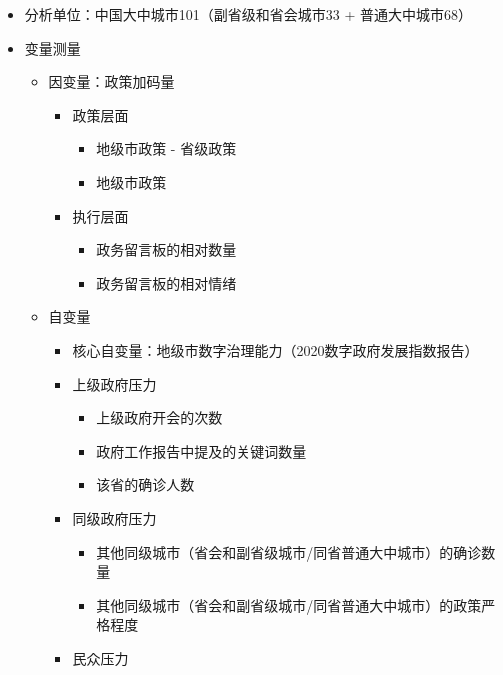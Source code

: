 \documentclass[
  12pt,
]{ctexart}
\providecommand{\tightlist}{%
  \setlength{\itemsep}{0pt}\setlength{\parskip}{0pt}}
\begin{document}
\begin{itemize}
\item
  分析单位：中国大中城市101（副省级和省会城市33 + 普通大中城市68）
\item
  变量测量

  \begin{itemize}
  \tightlist
  \item
    因变量：政策加码量

    \begin{itemize}
    \tightlist
    \item
      政策层面

      \begin{itemize}
      \tightlist
      \item
        地级市政策 - 省级政策
      \item
        地级市政策
      \end{itemize}
    \item
      执行层面

      \begin{itemize}
      \tightlist
      \item
        政务留言板的相对数量
      \item
        政务留言板的相对情绪
      \end{itemize}
    \end{itemize}
  \item
    自变量

    \begin{itemize}
    \tightlist
    \item
      核心自变量：地级市数字治理能力（2020数字政府发展指数报告）
    \item
      上级政府压力

      \begin{itemize}
      \tightlist
      \item
        上级政府开会的次数
      \item
        政府工作报告中提及的关键词数量
      \item
        该省的确诊人数
      \end{itemize}
    \item
      同级政府压力

      \begin{itemize}
      \tightlist
      \item
        其他同级城市（省会和副省级城市/同省普通大中城市）的确诊数量
      \item
        其他同级城市（省会和副省级城市/同省普通大中城市）的政策严格程度
      \end{itemize}
    \item
      民众压力


\end{itemize}
\end{itemize}
\end{itemize}
\end{document}
